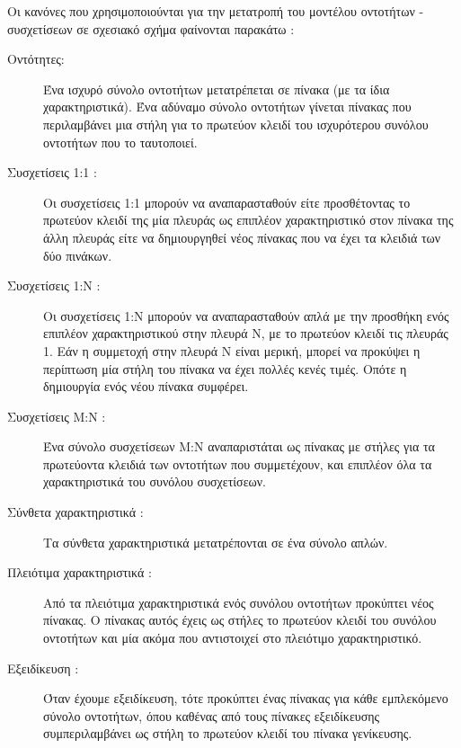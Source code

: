 \documentclass{assignment}
\begin{document}
Οι κανόνες που χρησιμοποιούνται για την μετατροπή του μοντέλου οντοτήτων - συσχετίσεων σε σχεσιακό σχήμα φαίνονται παρακάτω \cite{class_notes}:

\begin{description}

  \item[Οντότητες:] Ένα ισχυρό σύνολο οντοτήτων μετατρέπεται σε πίνακα (με τα ίδια χαρακτηριστικά). Ένα αδύναμο σύνολο οντοτήτων γίνεται πίνακας που περιλαμβάνει μια στήλη για το πρωτεύον κλειδί του ισχυρότερου συνόλου οντοτήτων που το ταυτοποιεί. 
  \item[Συσχετίσεις 1:1 :] Οι συσχετίσεις 1:1 μπορούν να αναπαρασταθούν είτε προσθέτοντας το πρωτεύον κλειδί της μία πλευράς ως επιπλέον χαρακτηριστικό στον πίνακα της άλλη πλευράς είτε να δημιουργηθεί νέος πίνακας που να έχει τα κλειδιά των δύο πινάκων.
  \item[Συσχετίσεις 1:Ν :] Οι συσχετίσεις 1:Ν μπορούν να αναπαρασταθούν απλά με την προσθήκη ενός επιπλέον χαρακτηριστικού στην πλευρά Ν, με το πρωτεύον κλειδί τις πλευράς 1. Εάν η συμμετοχή στην πλευρά Ν είναι μερική, μπορεί να προκύψει η περίπτωση μία στήλη του πίνακα να έχει πολλές κενές τιμές. Οπότε η δημιουργία ενός νέου πίνακα συμφέρει.
  \item[Συσχετίσεις Μ:Ν :] Ένα σύνολο συσχετίσεων M:N αναπαριστάται ως πίνακας με στήλες για τα πρωτεύοντα κλειδιά των οντοτήτων που συμμετέχουν, και επιπλέον όλα τα χαρακτηριστικά του συνόλου συσχετίσεων. 
  \item[Σύνθετα χαρακτηριστικά :] Τα σύνθετα χαρακτηριστικά μετατρέπονται σε ένα σύνολο απλών.
  \item[Πλειότιμα χαρακτηριστικά :] Από τα πλειότιμα χαρακτηριστικά ενός συνόλου οντοτήτων προκύπτει νέος πίνακας. Ο πίνακας αυτός έχεις ως στήλες το πρωτεύον κλειδί του συνόλου οντοτήτων και μία ακόμα που αντιστοιχεί στο πλειότιμο χαρακτηριστικό.
  \item[Εξειδίκευση :] Όταν έχουμε εξειδίκευση, τότε προκύπτει ένας πίνακας για κάθε εμπλεκόμενο σύνολο οντοτήτων, όπου καθένας από τους πίνακες εξειδίκευσης συμπεριλαμβάνει ως στήλη το πρωτεύον κλειδί του πίνακα γενίκευσης.
 
\end{description}
\end{document}
